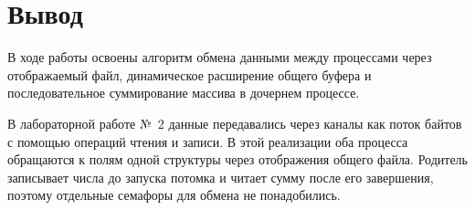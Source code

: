 \section{Вывод}

В ходе работы освоены алгоритм обмена данными между процессами через отображаемый
файл, динамическое расширение общего буфера и последовательное суммирование
массива в дочернем процессе.

В лабораторной работе №~2 данные передавались через каналы как поток байтов
с помощью операций чтения и записи. В этой реализации оба процесса обращаются
к полям одной структуры через отображения общего файла. Родитель записывает
числа до запуска потомка и читает сумму после его завершения, поэтому отдельные
семафоры для обмена не понадобились.
